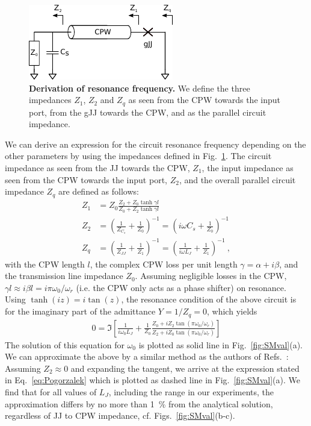 \begin{figure}
	\centering
	\includegraphics[width=0.5\linewidth]{chapter-gJJ-CPR/figs/rfderivation}
	\caption{
		\textbf{Derivation of resonance frequency.}
		We define the three impedances $Z_1$, $Z_2$ and $Z_q$ as seen from the CPW towards the input port, from the gJJ towards the CPW, and as the parallel circuit impedance.
	}
	\label{fig:rfderivation}
\end{figure}

We can derive an expression for the circuit resonance frequency depending on the other parameters by using the impedances defined in Fig.~\ref{fig:rfderivation}.
%
The circuit impedance as seen from the JJ towards the CPW, $Z_1$, the input impedance as seen from the CPW towards the input port, $Z_2$, and the overall parallel circuit impedance $Z_q$ are defined as follows:
%
\begin{align}
Z_1 &= Z_0 \frac{Z_2+Z_0\tanh\gamma l}{Z_0+Z_2\tanh\gamma l} \\
Z_2 &= \left(\frac{1}{Z_{C_s}}+\frac{1}{Z_0}\right)^{-1} = \left(i\omega C_s+\frac{1}{Z_0}\right)^{-1} \\
Z_q &= \left(\frac{1}{Z_{JJ}}+\frac{1}{Z_1}\right)^{-1} = \left(\frac{1}{i\omega L_J}+\frac{1}{Z_1}\right)^{-1}\ ,
\end{align}
%
with the CPW length $l$, the complex CPW loss per unit length $\gamma=\alpha+i\beta$, and the transmission line impedance $Z_0$.
%
Assuming negligible losses in the CPW, $\gamma l\approx i\beta l = i\pi\omega_0/\omega_r$ (i.e. the CPW only acts as a phase shifter) on resonance.
%
Using $\tanh(iz)=i\tan(z)$, the resonance condition of the above circuit is for the imaginary part of the admittance $Y=1/Z_q=0$, which yields
%
\begin{align}
0 = \Im \left[ \frac{1}{i\omega_0 L_J} + \frac{1}{Z_0}\frac{Z_0+iZ_2\tan\left(\pi\omega_0/\omega_r\right)}{Z_2+iZ_0\tan\left(\pi\omega_0/\omega_r\right)}\right]
\label{eq:SolAnalytical}
\end{align}
%
The solution of this equation for $\omega_0$ is plotted as solid line in Fig.~\ref{fig:SMval}(a).
%
We can approximate the above by a similar method as the authors of Refs.~\cite{wallquistSelectiveCouplingSuperconducting2006a,wustmannParametricResonanceTunable2013,pogorzalekHystereticFluxResponse2017}:
%
Assuming $Z_2\approx 0$ and expanding the tangent, we arrive at the expression stated in Eq.~\ref{eq:Pogorzalek} which is plotted as dashed line in Fig.~\ref{fig:SMval}(a).
%
We find that for all values of $L_J$, including the range in our experiments, the approximation differs by no more than \SI{1}{\percent} from the analytical solution, regardless of JJ to CPW impedance, cf. Figs.~\ref{fig:SMval}(b-c).


